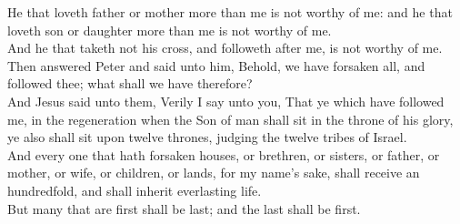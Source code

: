 \documentclass[10pt]{article} %
\begin{document}
{\begin{minipage}[t]{0.45\textwidth}
He that loveth father or mother more than me is not worthy of me: and he that loveth son or daughter more than me is not worthy of me.\\
And he that taketh not his cross, and followeth after me, is not worthy of me.\\
Then answered Peter and said unto him, Behold, we have forsaken all, and followed thee; what shall we have therefore?\\
And Jesus said unto them, Verily I say unto you, That ye which have followed me, in the regeneration when the Son of man shall sit in the throne of his glory, ye also shall sit upon twelve thrones, judging the twelve tribes of Israel.\\
And every one that hath forsaken houses, or brethren, or sisters, or father, or mother, or wife, or children, or lands, for my name's sake, shall receive an hundredfold, and shall inherit everlasting life.\\
But many that are first shall be last; and the last shall be first.
\end{minipage}}
\vspace*{\fill}
\newpage
\Huge%
\vspace*{\fill}
\begin{spacing}{1.0}
\end{spacing}
\vspace*{\fill}
\end{document}
